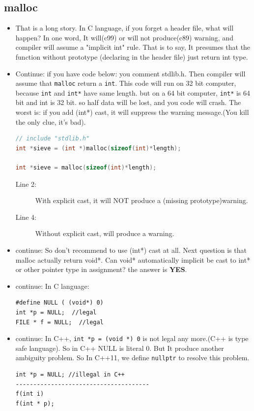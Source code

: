 \documentclass[a4paper,11pt,twoside]{book}
\begin{document}
\subsection{malloc}
\begin{itemize}
	\item That is a long story. In C language, if you forget a header file, what will happen? In one word, It will(c99) or will not produce(c89) warning, and compiler will assume a "implicit int" rule. That is to say, It presumes that the function without prototype (declaring in the header file) just return int type.
	
	\item Continue: if you have code below: you comment stdlib.h. Then compiler will assume that \texttt{malloc} return a \texttt{int}.  This code will run on 32 bit computer, because \texttt{int} and \texttt{int*} have same length. but on a 64 bit computer, \texttt{int*} is 64 bit and int is 32 bit.  so half data will be lost, and you code will crash. The worst is: if you add (int*) cast, it will suppress the warning message.(You kill the only clue, it's bad).
\begin{lstlisting}[frame=single, language=c++]
// include "stdlib.h"
int *sieve = (int *)malloc(sizeof(int)*length);
	
int *sieve = malloc(sizeof(int)*length);
\end{lstlisting}
\begin{description}
	\item[Line 2:] With explicit cast, it will NOT produce a (missing prototype)warning.
	\item[Line 4:] Without explicit cast, will produce a warning.
\end{description}

	\item continue: So don't recommend to use (int*) cast at all. Next question is that malloc actually return void*. Can void* automatically implicit be cast to int* or other pointer type in assignment? the answer is \textbf{YES}.
	
	\item  continue: In C language:
\begin{lstlisting}[numbers=none]
#define NULL ( (void*) 0)
int *p = NULL;  //legal
FILE * f = NULL;  //legal
\end{lstlisting}
	
	\item continue: In C++, \texttt{int *p = (void *) 0} is not legal any more.(C++ is type safe language).  So in C++ NULL is literal 0. But It produce another ambiguity problem.  So In C++11, we define \texttt{nullptr} to resolve this problem.
\begin{lstlisting}[numbers=none]
int *p = NULL; //illegal in C++
--------------------------------------
f(int i)
f(int * p);


\end{lstlisting}
\end{itemize}
\end{document}
